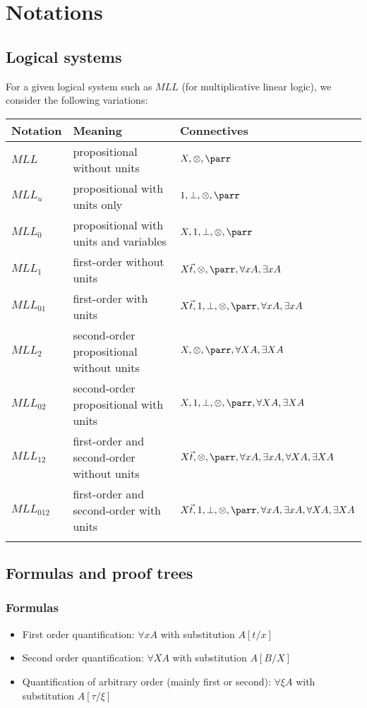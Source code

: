 \chapter{Notations}\label{notations}

\section{Logical systems}\label{logical-systems}

For a given logical system such as $MLL$ (for
multiplicative linear logic), we consider the following variations:

\begin{longtable}[]{@{}lll@{}}
\toprule
Notation & Meaning & Connectives\tabularnewline
\midrule
\endhead
$MLL$ &
propositional without units &
$X,{\tens},{\parr}$\tabularnewline
$MLL_u$ &
propositional with units only &
$\one,\bot,{\tens},{\parr}$\tabularnewline
$MLL_0$ &
propositional with units and variables &
$X,\one,\bot,{\tens},{\parr}$\tabularnewline
$MLL_1$ &
first-order without units &
$X\vec{t},{\tens},{\parr},\forall
x A,\exists x
A$\tabularnewline
$MLL_{01}$ &
first-order with units &
$X\vec{t},\one,\bot,{\tens},{\parr},\forall
x A,\exists x
A$\tabularnewline
$MLL_2$ &
second-order propositional without units &
$X,{\tens},{\parr},\forall
X A,\exists X
A$\tabularnewline
$MLL_{02}$ &
second-order propositional with units &
$X,\one,\bot,{\tens},{\parr},\forall
X A,\exists X
A$\tabularnewline
$MLL_{12}$ &
first-order and second-order without units &
$X\vec{t},{\tens},{\parr},\forall
x A,\exists x A,\forall X
A,\exists X
A$\tabularnewline
$MLL_{012}$
& first-order and second-order with units &
$X\vec{t},\one,\bot,{\tens},{\parr},\forall
x A,\exists x A,\forall X
A,\exists X
A$\tabularnewline
\tabularnewline
\bottomrule
\end{longtable}

\section{Formulas and proof trees}\label{formulas-and-proof-trees}

\subsection{Formulas}\label{formulas}

\begin{itemize}
\item
  First order quantification:
  $\forall x
  A$ with substitution
  $A[t/x]$
\item
  Second order quantification:
  $\forall X
  A$ with substitution
  $A[B/X]$
\item
  Quantification of arbitrary order (mainly first or second):
  $\forall\xi
  A$ with substitution
  $A[\tau/\xi]$
\end{itemize}

